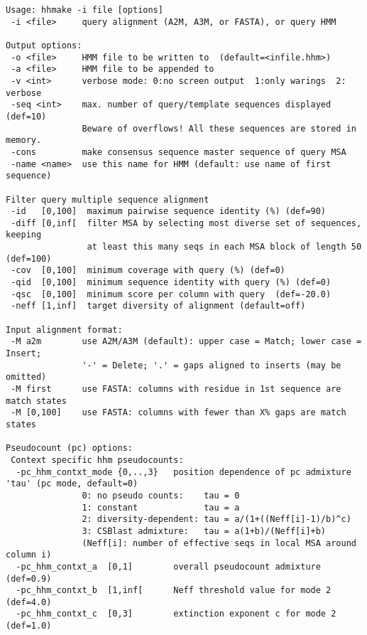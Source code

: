 \documentclass[11pt,a4paper]{article}
\begin{document}
\small 
\begin{verbatim}
Usage: hhmake -i file [options]                                       
 -i <file>     query alignment (A2M, A3M, or FASTA), or query HMM         

Output options:                                                           
 -o <file>     HMM file to be written to  (default=<infile.hhm>)          
 -a <file>     HMM file to be appended to                                 
 -v <int>      verbose mode: 0:no screen output  1:only warings  2: verbose
 -seq <int>    max. number of query/template sequences displayed (def=10)  
               Beware of overflows! All these sequences are stored in memory.
 -cons         make consensus sequence master sequence of query MSA 
 -name <name>  use this name for HMM (default: use name of first sequence)   

Filter query multiple sequence alignment                                     
 -id   [0,100]  maximum pairwise sequence identity (%) (def=90)   
 -diff [0,inf[  filter MSA by selecting most diverse set of sequences, keeping 
                at least this many seqs in each MSA block of length 50 (def=100) 
 -cov  [0,100]  minimum coverage with query (%) (def=0) 
 -qid  [0,100]  minimum sequence identity with query (%) (def=0) 
 -qsc  [0,100]  minimum score per column with query  (def=-20.0)
 -neff [1,inf]  target diversity of alignment (default=off)

Input alignment format:                                                    
 -M a2m        use A2M/A3M (default): upper case = Match; lower case = Insert;
               '-' = Delete; '.' = gaps aligned to inserts (may be omitted)   
 -M first      use FASTA: columns with residue in 1st sequence are match states
 -M [0,100]    use FASTA: columns with fewer than X% gaps are match states   

Pseudocount (pc) options:                                                        
 Context specific hhm pseudocounts:
  -pc_hhm_contxt_mode {0,..,3}   position dependence of pc admixture 'tau' (pc mode, default=0) 
               0: no pseudo counts:    tau = 0                                  
               1: constant             tau = a                                  
               2: diversity-dependent: tau = a/(1+((Neff[i]-1)/b)^c)            
               3: CSBlast admixture:   tau = a(1+b)/(Neff[i]+b)                 
               (Neff[i]: number of effective seqs in local MSA around column i) 
  -pc_hhm_contxt_a  [0,1]        overall pseudocount admixture (def=0.9)                        
  -pc_hhm_contxt_b  [1,inf[      Neff threshold value for mode 2 (def=4.0)                      
  -pc_hhm_contxt_c  [0,3]        extinction exponent c for mode 2 (def=1.0)                     


\end{verbatim}
\end{document}
